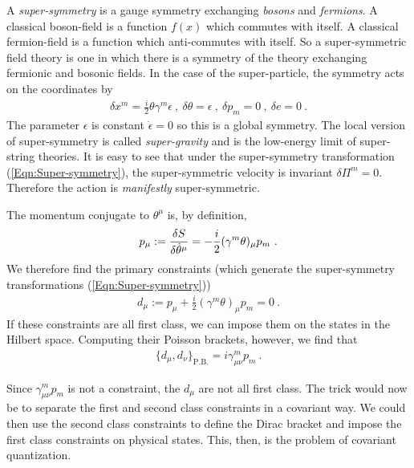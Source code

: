 \documentclass[12pt]{article}
\begin{document}
A {\em super-symmetry} is a gauge symmetry exchanging {\em bosons} and {\em fermions}. A classical boson-field is a function $f(x)$ which commutes with itself. A classical fermion-field is a function which anti-commutes with itself. So a super-symmetric field theory is one in which there is a symmetry of the theory exchanging fermionic and bosonic fields. In the case of the super-particle, the symmetry acts on the coordinates by
\begin{eqnarray}
\label{Eqn:Super-symmetry}
\delta x^m= \frac i2 \theta \gamma^m \epsilon~,~\delta \theta =\epsilon~,~\delta p_m=0~,~\delta e=0~.
\end{eqnarray}
The parameter $\epsilon$ is constant $\dot \epsilon=0$ so this is a global symmetry. The local version of super-symmetry is called {\em super-gravity} and is the low-energy limit of super-string theories. It is easy to see that under the super-symmetry transformation (\ref{Eqn:Super-symmetry}), the super-symmetric velocity is invariant $\delta \Pi^m=0$. Therefore the action is {\em manifestly} super-symmetric. 

The momentum conjugate to $\theta^\mu$ is, by definition,
\begin{eqnarray}
p_\mu:={\delta S\over \delta \dot \theta^\mu}= -\frac i2 (\gamma^m \theta)_\mu p_m~.
\end{eqnarray}
We therefore find the primary constraints \cite{Siegel:1985xj} (which generate the super-symmetry transformations (\ref{Eqn:Super-symmetry}))
\begin{eqnarray}
d_\mu:=p_\mu+\frac i2 (\gamma^m \theta)_\mu p_m=0~.
\end{eqnarray}
If these constraints are all first class, we can impose them on the states in the Hilbert space. 
Computing their Poisson brackets, however, we find that
\begin{eqnarray}
\label{Eqn:ConstraintAlgebra}
\{d_\mu, d_\nu\}_\mathrm{P.B.}=i\gamma^m_{\mu \nu} p_m~.
\end{eqnarray}

Since $\gamma^m_{\mu\nu}p_m$ is not a constraint, the $d_\mu$ are not all first class. The trick would now be to separate the first and second class constraints in a covariant way. We could then use the second class constraints to define the Dirac bracket and impose the first class constraints on physical states. This, then, is the problem of covariant quantization.
\end{document}
